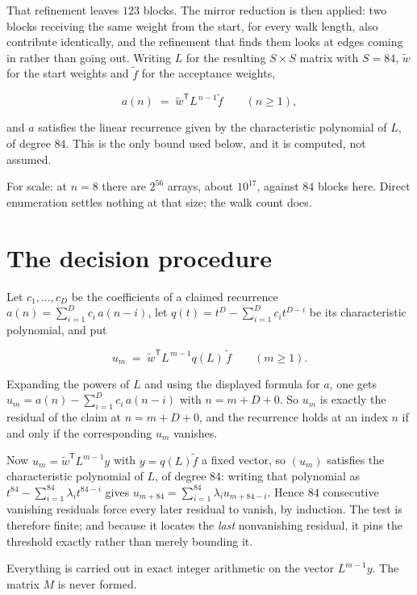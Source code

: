 \documentclass[11pt]{article}
\theoremstyle{definition}
\begin{document}
That refinement leaves $123$ blocks. The mirror reduction is then applied: two blocks receiving the same weight from the start, for every walk length, also contribute identically, and the refinement that finds them looks at edges coming in rather than going out. Writing $L$ for the resulting $S \times S$ matrix with $S = 84$, $\tilde w$ for the start weights and $\tilde f$ for the acceptance weights,

\[a(n) \;=\; \tilde w^{\mathsf T} L^{\,n-1} \tilde f \qquad (n \ge 1),\]

and $a$ satisfies the linear recurrence given by the characteristic polynomial of $L$, of degree $84$. This is the only bound used below, and it is computed, not assumed.

For scale: at $n = 8$ there are $2^{56}$ arrays, about $10^{17}$, against $84$ blocks here. Direct enumeration settles nothing at that size; the walk count does.

\section{The decision procedure}

Let $c_1,\dots,c_D$ be the coefficients of a claimed recurrence $a(n) = \sum_{i=1}^{D} c_i\,a(n-i)$, let $q(t) = t^{D} - \sum_{i=1}^{D} c_i t^{D-i}$ be its characteristic polynomial, and put

\[u_m \;=\; \tilde w^{\mathsf T} L^{\,m-1} q(L)\,\tilde f \qquad (m \ge 1).\]

Expanding the powers of $L$ and using the displayed formula for $a$, one gets $u_m = a(n) - \sum_{i=1}^{D} c_i\,a(n-i)$ with $n = m + D + 0$. So $u_m$ is exactly the residual of the claim at $n = m + D + 0$, and the recurrence holds at an index $n$ if and only if the corresponding $u_m$ vanishes.

Now $u_m = \tilde w^{\mathsf T} L^{m-1} y$ with $y = q(L)\tilde f$ a fixed vector, so $(u_m)$ satisfies the characteristic polynomial of $L$, of degree $84$: writing that polynomial as $t^{84} - \sum_{i=1}^{84} \lambda_i t^{84-i}$ gives $u_{m+84} = \sum_{i=1}^{84} \lambda_i u_{m+84-i}$. Hence $84$ consecutive vanishing residuals force every later residual to vanish, by induction. The test is therefore finite; and because it locates the {\itshape last} nonvanishing residual, it pins the threshold exactly rather than merely bounding it.

Everything is carried out in exact integer arithmetic on the vector $L^{m-1}y$. The matrix $M$ is never formed.
\end{document}
